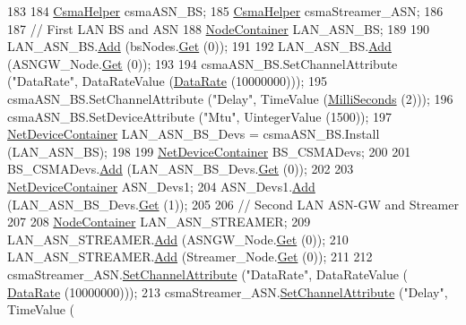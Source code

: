 \begin{DoxyCode}
183 
184   \hyperlink{classns3_1_1CsmaHelper}{CsmaHelper} csmaASN\_BS;
185   \hyperlink{classns3_1_1CsmaHelper}{CsmaHelper} csmaStreamer\_ASN;
186 
187   \textcolor{comment}{// First LAN BS and ASN}
188   \hyperlink{classns3_1_1NodeContainer}{NodeContainer} LAN\_ASN\_BS;
189 
190   LAN\_ASN\_BS.\hyperlink{classns3_1_1NodeContainer_aa60b3a0e70f2fb324e16ffcf8bf31fcb}{Add} (bsNodes.\hyperlink{classns3_1_1NodeContainer_a9ed96e2ecc22e0f5a3d4842eb9bf90bf}{Get} (0));
191 
192   LAN\_ASN\_BS.\hyperlink{classns3_1_1NodeContainer_aa60b3a0e70f2fb324e16ffcf8bf31fcb}{Add} (ASNGW\_Node.\hyperlink{classns3_1_1NodeContainer_a9ed96e2ecc22e0f5a3d4842eb9bf90bf}{Get} (0));
193 
194   csmaASN\_BS.SetChannelAttribute (\textcolor{stringliteral}{"DataRate"}, DataRateValue (\hyperlink{classns3_1_1DataRate}{DataRate} (10000000)));
195   csmaASN\_BS.SetChannelAttribute (\textcolor{stringliteral}{"Delay"}, TimeValue (\hyperlink{group__timecivil_gaf26127cf4571146b83a92ee18679c7a9}{MilliSeconds} (2)));
196   csmaASN\_BS.SetDeviceAttribute (\textcolor{stringliteral}{"Mtu"}, UintegerValue (1500));
197   \hyperlink{classns3_1_1NetDeviceContainer}{NetDeviceContainer} LAN\_ASN\_BS\_Devs = csmaASN\_BS.Install (LAN\_ASN\_BS);
198 
199   \hyperlink{classns3_1_1NetDeviceContainer}{NetDeviceContainer} BS\_CSMADevs;
200 
201   BS\_CSMADevs.\hyperlink{classns3_1_1NetDeviceContainer_a7ca8bc1d7ec00fd4fcc63869987fbda5}{Add} (LAN\_ASN\_BS\_Devs.\hyperlink{classns3_1_1NetDeviceContainer_a677d62594b5c9d2dea155cc5045f4d0b}{Get} (0));
202 
203   \hyperlink{classns3_1_1NetDeviceContainer}{NetDeviceContainer} ASN\_Devs1;
204   ASN\_Devs1.\hyperlink{classns3_1_1NetDeviceContainer_a7ca8bc1d7ec00fd4fcc63869987fbda5}{Add} (LAN\_ASN\_BS\_Devs.\hyperlink{classns3_1_1NetDeviceContainer_a677d62594b5c9d2dea155cc5045f4d0b}{Get} (1));
205 
206   \textcolor{comment}{// Second LAN ASN-GW and Streamer}
207 
208   \hyperlink{classns3_1_1NodeContainer}{NodeContainer} LAN\_ASN\_STREAMER;
209   LAN\_ASN\_STREAMER.\hyperlink{classns3_1_1NodeContainer_aa60b3a0e70f2fb324e16ffcf8bf31fcb}{Add} (ASNGW\_Node.\hyperlink{classns3_1_1NodeContainer_a9ed96e2ecc22e0f5a3d4842eb9bf90bf}{Get} (0));
210   LAN\_ASN\_STREAMER.\hyperlink{classns3_1_1NodeContainer_aa60b3a0e70f2fb324e16ffcf8bf31fcb}{Add} (Streamer\_Node.\hyperlink{classns3_1_1NodeContainer_a9ed96e2ecc22e0f5a3d4842eb9bf90bf}{Get} (0));
211 
212   csmaStreamer\_ASN.\hyperlink{classns3_1_1CsmaHelper_a886d900b2fe44433e0b81752dea7e7f1}{SetChannelAttribute} (\textcolor{stringliteral}{"DataRate"}, DataRateValue (
      \hyperlink{classns3_1_1DataRate}{DataRate} (10000000)));
213   csmaStreamer\_ASN.\hyperlink{classns3_1_1CsmaHelper_a886d900b2fe44433e0b81752dea7e7f1}{SetChannelAttribute} (\textcolor{stringliteral}{"Delay"}, TimeValue (

\end{DoxyCode}
